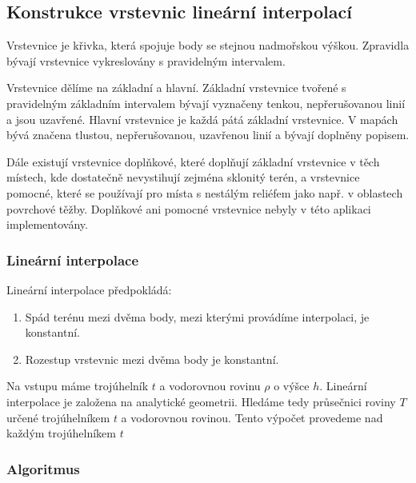 \documentclass[11pt]{article}
\begin{document}
\subsection{Konstrukce vrstevnic lineární interpolací}
Vrstevnice je křivka, která spojuje body se stejnou nadmořskou výškou. Zpravidla bývají vrstevnice vykreslovány s pravidelným intervalem.

Vrstevnice dělíme na základní a hlavní. Základní vrstevnice tvořené s pravidelným základním intervalem bývají vyznačeny tenkou, nepřerušovanou linií a jsou uzavřené. Hlavní vrstevnice je každá pátá základní vrstevnice. V mapách bývá značena tlustou, nepřerušovanou, uzavřenou linií a bývají doplněny popisem.

Dále existují vrstevnice doplňkové, které doplňují základní vrstevnice v těch místech, kde dostatečně nevystihují zejména sklonitý terén, a vrstevnice pomocné, které se používají pro místa s nestálým reliéfem jako např. v oblastech povrchové těžby. Doplňkové ani pomocné vrstevnice nebyly v této aplikaci implementovány.

\subsubsection{Lineární interpolace}
Lineární interpolace předpokládá:
\begin{enumerate}
\item Spád terénu mezi dvěma body, mezi kterými provádíme interpolaci, je konstantní.
\item Rozestup vrstevnic mezi dvěma body je konstantní.
\end{enumerate}

Na vstupu máme trojúhelník $t$ a vodorovnou rovinu $\rho$ o výšce $h$. Lineární interpolace je založena na analytické geometrii. Hledáme tedy průsečnici roviny $T$ určené trojúhelníkem $t$ a vodorovnou rovinou. Tento výpočet provedeme nad každým trojúhelníkem $t$

\subsubsection{Algoritmus}
\end{document}
